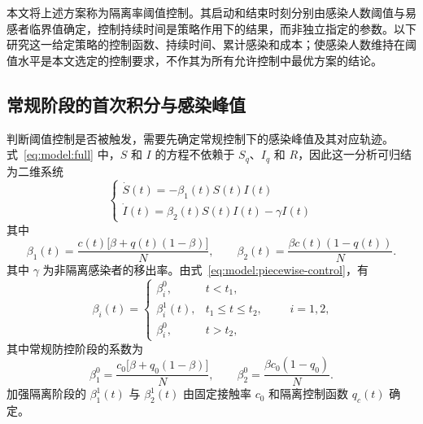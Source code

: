 \documentclass[lang=cn,a4paper,newtx]{elegantpaper}
\numberwithin{equation}{section}
\theoremstyle{plain}
\begin{document}
本文将上述方案称为隔离率阈值控制。其启动和结束时刻分别由感染人数阈值与易感者临界值确定，控制持续时间是策略作用下的结果，而非独立指定的参数。以下研究这一给定策略的控制函数、持续时间、累计感染和成本；使感染人数维持在阈值水平是本文选定的控制要求，不作其为所有允许控制中最优方案的结论。

\subsection{常规阶段的首次积分与感染峰值}
判断阈值控制是否被触发，需要先确定常规控制下的感染峰值及其对应轨迹。式~\eqref{eq:model:full} 中，$S$ 和 $I$ 的方程不依赖于 $S_q$、$I_q$ 和 $R$，因此这一分析可归结为二维系统
\begin{equation}
\begin{cases}
\dot{S}(t) = - \beta_1(t) S(t) I(t) \\
\dot{I}(t) =   \beta_2(t) S(t) I(t) - \gamma I(t)
\end{cases}
\label{eq:model:reduced-si}
\end{equation}
其中
\begin{equation}
\beta_1(t)=\frac{c(t)\big[\beta+q(t)(1-\beta)\big]}{N},
\qquad
\beta_2(t)=\frac{\beta c(t)(1-q(t))}{N}.
\label{eq:model:beta12-general}
\end{equation}
其中 $\gamma$ 为非隔离感染者的移出率。由式~\eqref{eq:model:piecewise-control}，有
\begin{equation}
\beta_i(t)=
\begin{cases}
\beta_i^0, & t<t_1,\\
\beta_i^1(t), & t_1\le t\le t_2,\\
\beta_i^0, & t>t_2,
\end{cases}
\qquad i=1,2,
\end{equation}
其中常规防控阶段的系数为
\begin{equation}
\beta_1^0=\frac{c_0\big[\beta+q_0(1-\beta)\big]}{N},
\qquad
\beta_2^0=\frac{\beta c_0(1-q_0)}{N}.
\label{eq:model:beta12-baseline}
\end{equation}
加强隔离阶段的 $\beta_1^1(t)$ 与 $\beta_2^1(t)$ 由固定接触率 $c_0$ 和隔离控制函数 $q_c(t)$ 确定。
\end{document}

